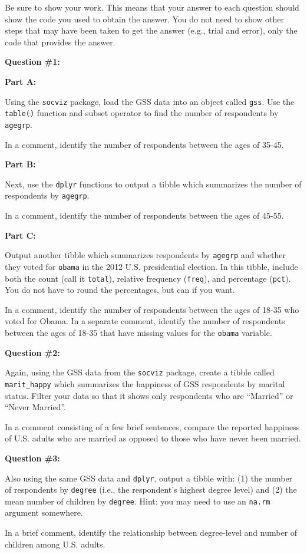 \documentclass[
]{book}
\begin{document}
Be sure to show your work. This means that your answer to each question should show the code you used to obtain the answer. You do not need to show other steps that may have been taken to get the answer (e.g., trial and error), only the code that provides the answer.

\textbf{Question \#1:}

\textbf{Part A:}

Using the \texttt{socviz} package, load the GSS data into an object called \texttt{gss}. Use the \texttt{table()} function and subset operator to find the number of respondents by \texttt{agegrp}.

In a comment, identify the number of respondents between the ages of 35-45.

\textbf{Part B:}

Next, use the \texttt{dplyr} functions to output a tibble which summarizes the number of respondents by \texttt{agegrp}.

In a comment, identify the number of respondents between the ages of 45-55.

\textbf{Part C:}

Output another tibble which summarizes respondents by \texttt{agegrp} and whether they voted for \texttt{obama} in the 2012 U.S. presidential election. In this tibble, include both the count (call it \texttt{total}), relative frequency (\texttt{freq}), and percentage (\texttt{pct}). You do not have to round the percentages, but can if you want.

In a comment, identify the number of respondents between the ages of 18-35 who voted for Obama. In a separate comment, identify the number of respondents between the ages of 18-35 that have missing values for the \texttt{obama} variable.

\textbf{Question \#2:}

Again, using the GSS data from the \texttt{socviz} package, create a tibble called \texttt{marit\_happy} which summarizes the happiness of GSS respondents by marital status. Filter your data so that it shows only respondents who are ``Married'' or ``Never Married''.

In a comment consisting of a few brief sentences, compare the reported happiness of U.S. adults who are married as opposed to those who have never been married.

\textbf{Question \#3:}

Also using the same GSS data and \texttt{dplyr}, output a tibble with: (1) the number of respondents by \texttt{degree} (i.e., the respondent's highest degree level) and (2) the mean number of children by \texttt{degree}. Hint: you may need to use an \texttt{na.rm} argument somewhere.

In a brief comment, identify the relationship between degree-level and number of children among U.S. adults.

  
\end{document}
